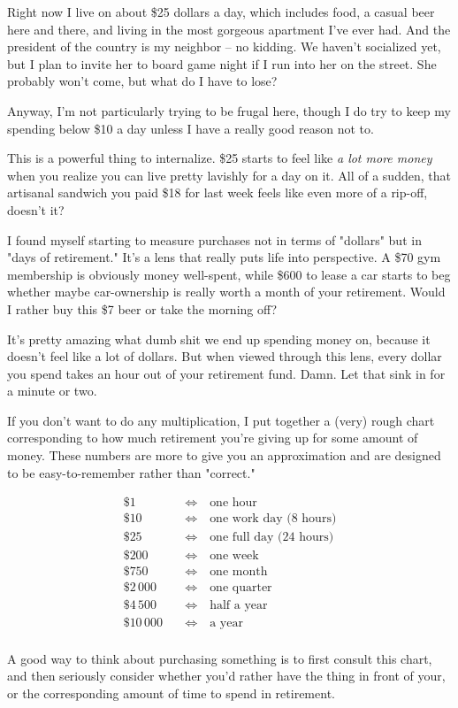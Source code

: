 \documentclass[]{book}
\newcommand{\undefine}[1]{\let#1\undefined}
\begin{document}
Right now I live on about \$25 dollars a day, which includes food, a casual beer
here and there, and living in the most gorgeous apartment I've ever had. And the
president of the country is my neighbor -- no kidding. We haven't socialized
yet, but I plan to invite her to board game night if I run into her on the
street. She probably won't come, but what do I have to lose?

Anyway,  I'm not particularly trying to be frugal
here, though I do try to keep my spending below \$10 a day unless I have a
really good reason not to.

This is a powerful thing to internalize. \$25 starts to feel like \emph{a lot
more money} when you realize you can live pretty lavishly for a day on it. All
of a sudden, that artisanal sandwich you paid \$18 for last week feels like even
more of a rip-off, doesn't it?

I found myself starting to measure purchases not in terms of "dollars" but in
"days of retirement." It's a lens that really puts life into perspective. A \$70
gym membership is obviously money well-spent, while \$600 to lease a car starts
to beg whether maybe car-ownership is really worth a month of your retirement.
Would I rather buy this \$7 beer or take the morning off?

 It's pretty amazing what dumb shit we end up spending
money on, because it doesn't feel like a lot of dollars. But when viewed through
this lens, every dollar you spend takes an hour out of your retirement fund.
Damn. Let that sink in for a minute or two.

If you don't want to do any multiplication, I put together a (very) rough chart
corresponding to how much retirement you're giving up for some amount of money.
These numbers are more to give you an approximation and are designed to be
easy-to-remember rather than "correct."

\newcommand{\xx}[2]{\$#1 &\quad\iff\quad \text{#2}\\}
\begin{align*}
  \xx{1}{one hour}
  \xx{10}{one work day (8 hours)}
  \xx{25}{one full day (24 hours)}
  \xx{200}{one week}
  \xx{750}{one month}
  \xx{2\,000}{one quarter}
  \xx{4\,500}{half a year}
  \xx{10\,000}{a year}
\end{align*}
\undefine\xx

A good way to think about purchasing something is to first consult this chart,
and then seriously consider whether you'd rather have the thing in front of
your, or the corresponding amount of time to spend in retirement.
\end{document}
